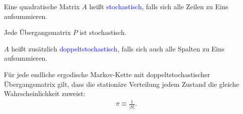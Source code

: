 \documentclass{beamer}
\def\padding{\vspace{0.5cm}}
\def\spadding{\vspace{0.25cm}}
\def\b{\textcolor{blue}}
\begin{document}
\begin{frame}
    \begin{definition}
        Eine quadratische Matrix $A$ heißt \b{stochastisch}, falls sich alle Zeilen zu Eins aufsummieren.\pause\par
        Jede Übergangsmatrix $P$ ist stochastisch.\pause\par\spadding
        $A$ heißt zusätzlich \b{doppeltstochastisch}, falls sich auch alle Spalten zu Eins aufsummieren.
    \end{definition}\pause\par\padding
    Für jede endliche ergodische Markov-Kette mit doppeltstochastischer Übergangsmatrix gilt, dass die stationäre Verteilung jedem Zustand die gleiche Wahrscheinlichkeit zuweist:
    \begin{align*}
        \pi \equiv \frac{1}{|S|}.
    \end{align*}
\end{frame}
\end{document}
